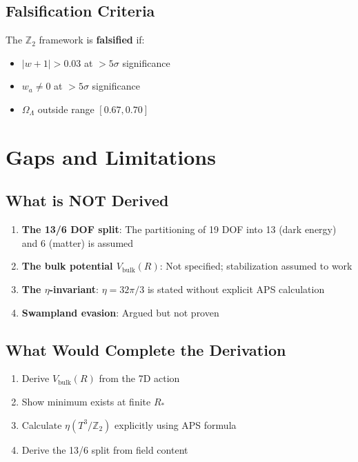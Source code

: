 \documentclass[12pt,a4paper]{article}
\begin{document}
\subsection{Falsification Criteria}

The $\mathbb{Z}_2$ framework is \textbf{falsified} if:
\begin{itemize}
    \item $|w + 1| > 0.03$ at $>5\sigma$ significance
    \item $w_a \neq 0$ at $>5\sigma$ significance
    \item $\Omega_\Lambda$ outside range $[0.67, 0.70]$
\end{itemize}

\section{Gaps and Limitations}

\subsection{What is NOT Derived}

\begin{enumerate}
    \item \textbf{The 13/6 DOF split}: The partitioning of 19 DOF into 13 (dark energy) and 6 (matter) is assumed
    \item \textbf{The bulk potential $V_{\text{bulk}}(R)$}: Not specified; stabilization assumed to work
    \item \textbf{The $\eta$-invariant}: $\eta = 32\pi/3$ is stated without explicit APS calculation
    \item \textbf{Swampland evasion}: Argued but not proven
\end{enumerate}

\subsection{What Would Complete the Derivation}

\begin{enumerate}
    \item Derive $V_{\text{bulk}}(R)$ from the 7D action
    \item Show minimum exists at finite $R_*$
    \item Calculate $\eta(T^3/\mathbb{Z}_2)$ explicitly using APS formula
    \item Derive the 13/6 split from field content
\end{enumerate}
\end{document}
